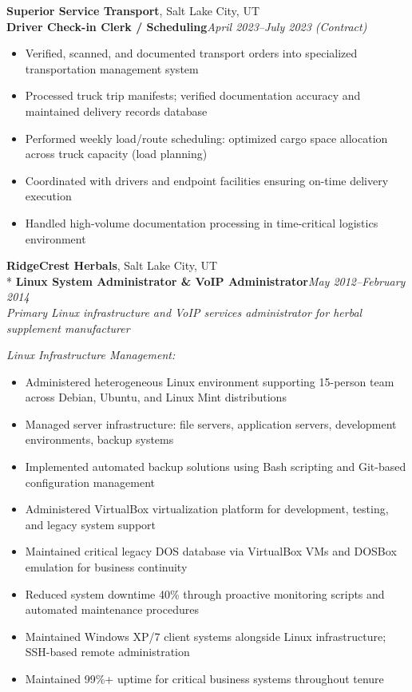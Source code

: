 \documentclass[9pt,letterpaper]{extarticle}
\begin{document}
\vspace{5pt}
\noindent\textbf{Superior Service Transport}, Salt Lake City, UT\\
\textbf{Driver Check-in Clerk / Scheduling}\hfill\textit{April 2023--July 2023 (Contract)}
\begin{itemize}
  \item Verified, scanned, and documented transport orders into specialized transportation management system
  \item Processed truck trip manifests; verified documentation accuracy and maintained delivery records database
  \item Performed weekly load/route scheduling: optimized cargo space allocation across truck capacity (load planning)
  \item Coordinated with drivers and endpoint facilities ensuring on-time delivery execution
  \item Handled high-volume documentation processing in time-critical logistics environment
\end{itemize}

\newpage
\noindent\textbf{RidgeCrest Herbals}, Salt Lake City, UT\\*
\textbf{Linux System Administrator \& VoIP Administrator}\hfill\textit{May 2012--February 2014}\\
\textit{Primary Linux infrastructure and VoIP services administrator for herbal supplement manufacturer}

\smallskip\textit{Linux Infrastructure Management:}
\begin{itemize}
  \item Administered heterogeneous Linux environment supporting 15-person team across Debian, Ubuntu, and Linux Mint distributions
  \item Managed server infrastructure: file servers, application servers, development environments, backup systems
  \item Implemented automated backup solutions using Bash scripting and Git-based configuration management
  \item Administered VirtualBox virtualization platform for development, testing, and legacy system support
  \item Maintained critical legacy DOS database via VirtualBox VMs and DOSBox emulation for business continuity
  \item Reduced system downtime 40\% through proactive monitoring scripts and automated maintenance procedures
  \item Maintained Windows XP/7 client systems alongside Linux infrastructure; SSH-based remote administration
  \item Maintained 99\%+ uptime for critical business systems throughout tenure
\end{itemize}
\end{document}
